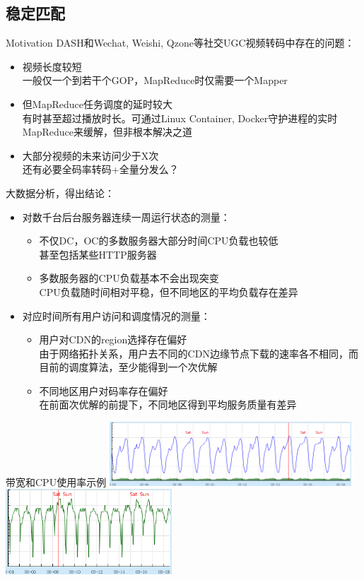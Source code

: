 \documentclass{beamer}
\begin{document}
\subsection{稳定匹配}
\begin{frame}{Motivation}
DASH和Wechat, Weishi, Qzone等社交UGC视频转码中存在的问题：\pause
\begin{itemize}
\item 视频长度较短\\
一般仅一个到若干个GOP，MapReduce时仅需要一个Mapper
\item 但MapReduce任务调度的延时较大\\
有时甚至超过播放时长。可通过Linux Container, Docker守护进程的实时MapReduce来缓解，但非根本解决之道
\item 大部分视频的未来访问少于X次\\
还有必要全码率转码+全量分发么？
\end{itemize}
\end{frame}
\begin{frame}{大数据分析，得出结论：}
\begin{itemize}
	\item 对数千台后台服务器连续一周运行状态的测量：\\
		\begin{itemize}
		\item 不仅DC，OC的多数服务器大部分时间CPU负载也较低\\
		甚至包括某些HTTP服务器
		\item 多数服务器的CPU负载基本不会出现突变\\
		CPU负载随时间相对平稳，但不同地区的平均负载存在差异
		\end{itemize}
	\item 对应时间所有用户访问和调度情况的测量：\\
		\begin{itemize}
		\item 用户对CDN的region选择存在偏好\\
		由于网络拓扑关系，用户去不同的CDN边缘节点下载的速率各不相同，而目前的调度算法，至少能得到一个次优解
		\item 不同地区用户对码率存在偏好\\
		在前面次优解的前提下，不同地区得到平均服务质量有差异
	\end{itemize}
\end{itemize}
\end{frame}
\begin{frame}{带宽和CPU使用率示例}
\includegraphics[height=2.4cm]{fig/bandwidth.png}\\
\includegraphics[height=3.2cm]{fig/cpu_usage.png}
\end{frame}
\end{document}
